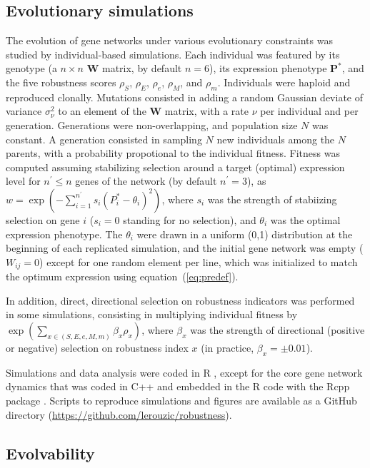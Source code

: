 \documentclass[10pt,a4paper]{article}
\newcommand{\stability}{{\rho_S}}
\newcommand{\earlyenv}{{\rho_E}}
\newcommand{\lateenv}{{\rho_e}}
\newcommand{\earlymut}{{\rho_M}}
\newcommand{\latemut}{{\rho_m}}
\begin{document}
\subsection{Evolutionary simulations}

The evolution of gene networks under various evolutionary constraints was studied by individual-based simulations. Each individual was featured by its genotype (a $n \times n$ $\bm W$ matrix, by default $n=6$), its expression phenotype $\bm P^*$, and the five robustness scores $\stability$, $\earlyenv$, $\lateenv$, $\earlymut$, and $\latemut$. Individuals were haploid and reproduced clonally. Mutations consisted in adding a random Gaussian deviate of variance $\sigma_\nu^2$ to an element of the $\bm W$ matrix, with a rate $\nu$ per individual and per generation. Generations were non-overlapping, and population size $N$ was constant. A generation consisted in sampling $N$ new individuals among the $N$ parents, with a probability propotional to the individual fitness. Fitness was computed assuming stabilizing selection around a target (optimal) expression level for $n^\prime \leq n$ genes of the network (by default $n^\prime=3$), as $w = \exp(- \sum_{i=1}^{n^\prime} s_i (P_i^* - \theta_i)^2 )$, where $s_i$ was the strength of stabiizing selection on gene $i$ ($s_i = 0$ standing for no selection), and $\theta_i$ was the optimal expression phenotype. The $\theta_i$ were drawn in a uniform (0,1) distribution at the beginning of each replicated simulation, and the initial gene network was empty ($W_{ij} = 0$) except for one random element per line, which was initialized to match the optimum expression using equation~(\ref{eq:predef}). 

In addition, direct, directional selection on robustness indicators was performed in some simulations, consisting in multiplying individual fitness by $\exp ( \sum_{x \in (S, E, e, M, m)} \beta_x \rho _x )$, where $\beta_x$ was the strength of directional (positive or negative) selection on robustness index $x$ (in practice, $\beta_x= \pm 0.01$). 

Simulations and data analysis were coded in R \citep{R20}, except for the core gene network dynamics that was coded in C++ and embedded in the R code with the Rcpp package \citep{EF11}. Scripts to reproduce simulations and figures are available as a GitHub directory (\url{https://github.com/lerouzic/robustness}). 

\subsection{Evolvability}
\end{document}
